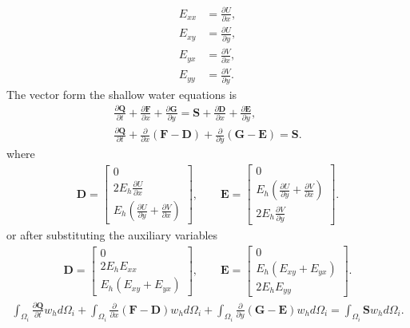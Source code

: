 \documentclass[11pt]{article}
\begin{document}
\begin{align}
E_{xx} &= \frac{\partial U}{\partial x}, \\
E_{xy} &= \frac{\partial U}{\partial y}, \\
E_{yx} &= \frac{\partial V}{\partial x}, \\
E_{yy} &= \frac{\partial V}{\partial y}.
\end{align}
The vector form the shallow water equations is 
\begin{gather}
\frac{\partial \mathbf{Q}}{\partial t} + \frac{\partial \mathbf{F}}{\partial x} + \frac{\partial \mathbf{G}}{\partial y} = \mathbf{S} + \frac{\partial\mathbf{D}}{\partial x} + \frac{\partial\mathbf{E}}{\partial y}, \\
\frac{\partial \mathbf{Q}}{\partial t} + \frac{\partial }{\partial x}\left(\mathbf{F}-\mathbf{D}\right) + \frac{\partial }{\partial y}\left(\mathbf{G} - \mathbf{E} \right) = \mathbf{S}.
\end{gather}
where
\begin{align}
\mathbf{D} = \begin{bmatrix} 0 \\ 2E_h\frac{\partial U}{\partial x} \\ E_h\left(\frac{\partial U}{\partial y} + \frac{\partial V}{\partial x}\right) \end{bmatrix}, \quad \quad \mathbf{E} = \begin{bmatrix} 0 \\ E_h\left(\frac{\partial U}{\partial y} + \frac{\partial V}{\partial x}\right) \\ 2E_h\frac{\partial V}{\partial y} \end{bmatrix}.
\end{align}
or after substituting the auxiliary variables
\begin{align}
\mathbf{D} = \begin{bmatrix} 0 \\ 2E_hE_{xx} \\ E_h\left(E_{xy} + E_{yx}\right) \end{bmatrix}, \quad \quad \mathbf{E} = \begin{bmatrix} 0 \\ E_h\left(E_{xy} + E_{yx}\right) \\ 2E_hE_{yy} \end{bmatrix}.
\end{align}
\begin{gather}
\int_{\Omega_i}\frac{\partial \mathbf{Q}}{\partial t} w_h d\Omega_i+ \int_{\Omega_i}\frac{\partial }{\partial x}\left(\mathbf{F}-\mathbf{D}\right) w_h d\Omega_i+ \int_{\Omega_i}\frac{\partial }{\partial y}\left(\mathbf{G} - \mathbf{E} \right) w_h d\Omega_i= \int_{\Omega_i}\mathbf{S}w_h d\Omega_i.
\end{gather}
\end{document}
